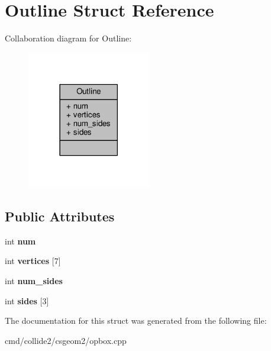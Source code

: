 \hypertarget{structOutline}{}\section{Outline Struct Reference}
\label{structOutline}


Collaboration diagram for Outline\+:
\nopagebreak
\begin{figure}[H]
\begin{center}
\leavevmode
\includegraphics[width=153pt]{d1/d0c/structOutline__coll__graph}
\end{center}
\end{figure}
\subsection*{Public Attributes}
\begin{DoxyCompactItemize}
\item 
int {\bfseries num}\hypertarget{structOutline_a92e491de2054cc3b1a0b33fda80966a4}{}\label{structOutline_a92e491de2054cc3b1a0b33fda80966a4}

\item 
int {\bfseries vertices} \mbox{[}7\mbox{]}\hypertarget{structOutline_a269063720beb742a57357be6b6ed0ec1}{}\label{structOutline_a269063720beb742a57357be6b6ed0ec1}

\item 
int {\bfseries num\+\_\+sides}\hypertarget{structOutline_a2295e069cdad562125d061d0759c70dd}{}\label{structOutline_a2295e069cdad562125d061d0759c70dd}

\item 
int {\bfseries sides} \mbox{[}3\mbox{]}\hypertarget{structOutline_a44935ed3332d11272965efc262872351}{}\label{structOutline_a44935ed3332d11272965efc262872351}

\end{DoxyCompactItemize}


The documentation for this struct was generated from the following file\+:\begin{DoxyCompactItemize}
\item 
cmd/collide2/csgeom2/opbox.\+cpp\end{DoxyCompactItemize}
